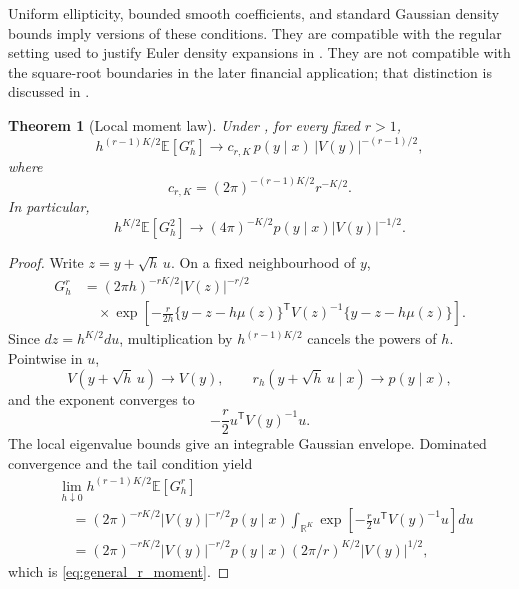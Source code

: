 \documentclass[11pt]{article}
\newtheorem{theorem}{Theorem}[section]
\theoremstyle{definition}
\newcommand{\R}{\mathbb{R}}
\newcommand{\E}{\mathbb{E}}
\begin{document}
Uniform ellipticity, bounded smooth coefficients, and standard Gaussian density bounds imply versions of these conditions. They are compatible with the regular setting used to justify Euler density expansions in \citet{BallyTalay1995,BallyTalay1996}. They are not compatible with the square-root boundaries in the later financial application; that distinction is discussed in .

\begin{theorem}[Local moment law]\label{thm:local_moments}
Under , for every fixed $r>1$,
\begin{equation}\label{eq:general_r_moment}
 h^{(r-1)K/2}\E[G_h^r]
\longrightarrow
c_{r,K}\,p(y\mid x)\,|V(y)|^{-(r-1)/2},
\end{equation}
where
\begin{equation}\label{eq:crk}
c_{r,K}=(2\pi)^{-(r-1)K/2}r^{-K/2}.
\end{equation}
In particular,
\begin{equation}\label{eq:general_second}
 h^{K/2}\E[G_h^2]
\longrightarrow
(4\pi)^{-K/2}p(y\mid x)|V(y)|^{-1/2}.
\end{equation}
\end{theorem}

\begin{proof}
Write $z=y+\sqrt h\,u$. On a fixed neighbourhood of $y$,
\begin{align*}
G_h^r
&=(2\pi h)^{-rK/2}|V(z)|^{-r/2}\\
&\quad\times
\exp\!\left[-\frac{r}{2h}
\{y-z-h\mu(z)\}^{\mathsf T}V(z)^{-1}
\{y-z-h\mu(z)\}\right].
\end{align*}
Since $dz=h^{K/2}du$, multiplication by $h^{(r-1)K/2}$ cancels the powers of $h$. Pointwise in $u$,
\[
V(y+\sqrt h\,u)\to V(y),
\qquad
r_h(y+\sqrt h\,u\mid x)\to p(y\mid x),
\]
and the exponent converges to
\[
-\frac r2u^{\mathsf T}V(y)^{-1}u.
\]
The local eigenvalue bounds give an integrable Gaussian envelope. Dominated convergence and the tail condition yield
\begin{align*}
&\lim_{h\downarrow0}h^{(r-1)K/2}\E[G_h^r]\\
&\quad=(2\pi)^{-rK/2}|V(y)|^{-r/2}p(y\mid x)
\int_{\R^K}\exp\!\left[-\frac r2u^{\mathsf T}V(y)^{-1}u\right]du\\
&\quad=(2\pi)^{-rK/2}|V(y)|^{-r/2}p(y\mid x)
(2\pi/r)^{K/2}|V(y)|^{1/2},
\end{align*}
which is \eqref{eq:general_r_moment}.
\end{proof}
\end{document}
